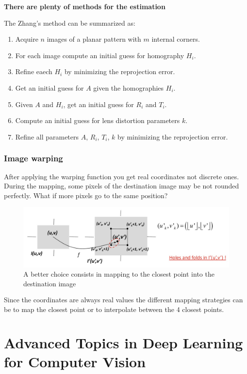 \documentclass{article}
\begin{document}
\textbf{There are plenty of methods for the estimation}

The Zhang's method can be summarized as:
\begin{enumerate}
  \item Acquire $n$ images of a planar pattern with $m$ internal corners.
  \item For each image compute an initial guess for homography $H_i$.
  \item Refine eaech $H_i$ by minimizing the reprojection error.
  \item Get an initial guess for $A$ given the homographies $H_i$.
  \item Given $A$ and $H_i$, get an initial guess for $R_i$ and $T_i$.
  \item Compute an initial guess for lens distortion parameters $k$.
  \item Refine all parameters $A$, $R_i$, $T_i$, $k$ by minimizing the reprojection error.
\end{enumerate}

\subsubsection{Image warping}


After applying the warping function you get real coordinates not discrete ones.
During the mapping, some pixels of the destination image may be not rounded perfectly.
What if more pixels go to the same position?
\begin{figure}[htbp]
  \centering
  \includegraphics[width=0.8\linewidth]{./img/forward_mapping.jpg}
  \caption{A better choice consists in mapping to the closest point into the destination image}
  \label{fig:forward_mapping}
\end{figure}

Since the coordinates are always real values the different mapping strategies can be to map the closest point or to interpolate between the 4 closest points.







\vspace{3em}
\section{Advanced Topics in Deep Learning for Computer Vision}
\end{document}
